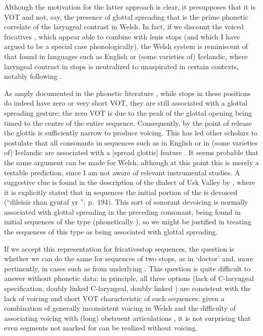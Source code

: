 Although the motivation for the latter approach is clear, it presupposes that it is VOT and not, say, the presence of glottal spreading \citep{halle71,stevens89:_primar_featur_their_enhan_conson,avery01:_laryn} that is the prime phonetic correlate of the laryngeal contrast in Welsh. In fact, if we discount the voiced fricatives \ipa{[v~ð]}, which appear able to combine with lenis stops (and which I have argued to be a special case phonologically), the Welsh system is reminiscent of that found in languages such as English or (some varieties of) Icelandic, where laryngeal contrast in stops is neutralized to unaspirated in certain contexts, notably following \ipa{[s]}.

As amply documented in the phonetic literature \citep[\egm][]{kim70,petursson78:_joint,yoshioka81:_laryn_americ_englis,lofqvist81:_laryn_activ_icelan_obstr_produc,kingston90:_artic}, while stops in these positions do indeed have zero or very short VOT, they are still associated with a glottal spreading gesture; the zero VOT is due to the peak of the glottal opening being timed to the centre of the entire sequence. Consequently, by the point of release the glottis is sufficiently narrow to produce voicing. This has led other scholars to postulate that all consonants in sequences such as \ipa{[st]} in English or \ipa{[l̥\kern-1pt t]} in (some varieties of) Icelandic are associated with a [spread glottis] feature \citep{iverson95,iverson99:_laryn_german,vaux-fricatives,ringen99:_aspir_preas_deasp_sonor_devoic_spiran_icelan}. It seems probable that the same argument can be made for Welsh, although at this point this is merely a testable prediction, since I am not aware of relevant instrumental studies. A suggestive clue is found in the description of the dialect of Usk Valley by \citet{thomas61:_ffonem_dyffr_wysg}, where it is explicitly stated that in  sequences the initial portion of the \ipa{[r]} is devoiced (\enquote{\textwelsh{dileisir rhan gyntaf yr \ipa{[r]}}}; p.~194). This sort of sonorant devoicing is normally associated with glottal spreading in the preceding consonant, being found in initial sequences of the type \ipa{[pl]} (phonetically ), so we might be justified in treating the \ipa{[sp~st~sk]} sequences of this type as being associated with glottal spreading.

If we accept this representation for fricative\endash stop sequences, the question is whether we can do the same for sequences of two stops, as in \ipa{[ˈdoktor]} `doctor' and, more pertinently, in cases such as \ipa{[ˈɡwakter]} from underlying . This question is quite difficult to answer without phonetic data: in principle, all three options (lack of C-laryngeal specification, doubly linked C-laryngeal, doubly linked ) are consistent with the lack of voicing and short VOT characteristic of such sequences: given a combination of generally inconsistent voicing in Welsh and the difficulty of associating voicing with (long) obstruent articulations \citep[\egm][]{ohala:_turbul}, it is not surprising that even segments not marked for  can be realized without voicing.

